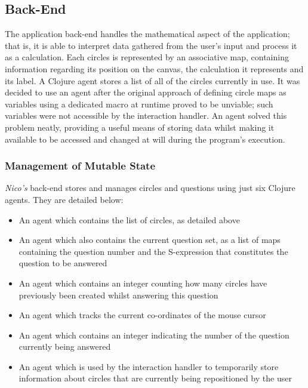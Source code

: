 \documentclass[12pt,twoside,notitlepage,xetex]{report}
\begin{document}
\subsection{Back-End}

The application back-end handles the mathematical aspect of the application;
that is, it is able to interpret data gathered from the user's input and
process it as a calculation.  Each circles is represented by an associative map,
containing information regarding its position on the canvas, the calculation it
represents and its label.  A Clojure agent stores a list of all of the circles
currently in use.  It was decided to use an agent after the original approach
of defining circle maps as variables using a dedicated macro at runtime proved
to be unviable; such variables were not accessible by the interaction handler.
An agent solved this problem neatly, providing a useful means of storing data
whilst making it available to be accessed and changed at will during the
program's execution.

\subsubsection{Management of Mutable State}

\emph{Nico's} back-end stores and manages circles and questions using just six
Clojure agents.  They are detailed below:
\begin{itemize}
\item An agent which contains the list of circles, as detailed above
\item An agent which also contains the current question set, as a list of maps containing the question number and the S-expression that constitutes the question to be answered
\item An agent which contains an integer counting how many circles have previously been created whilst answering this question
\item An agent which tracks the current co-ordinates of the mouse cursor
\item An agent which contains an integer indicating the number of the question currently being answered
\item An agent which is used by the interaction handler to temporarily store information about circles that are currently being repositioned by the user
\end{itemize}
\end{document}
